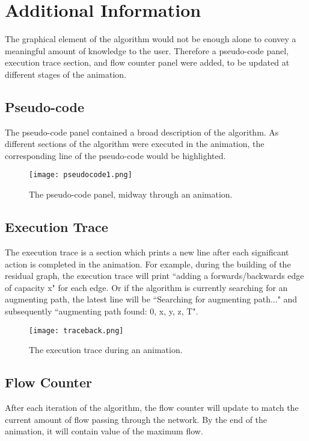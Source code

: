 \documentclass{l4proj}
\begin{document}
\section{Additional Information}
The graphical element of the algorithm would not be enough alone to convey a meaningful amount of knowledge to the user. Therefore a pseudo-code panel, execution trace section, and flow counter panel were added, to be updated at different stages of the animation.
\subsection{Pseudo-code}
The pseudo-code panel contained a broad description of the algorithm. As different sections of the algorithm were executed in the animation, the corresponding line of the pseudo-code would be highlighted.

\begin{figure}[h]
    \centering
    \texttt{[image: pseudocode1.png]}
    \caption{The pseudo-code panel, midway through an animation.}
    \label{fig:my_label}
\end{figure}

\subsection{Execution Trace}
The execution trace is a section which prints a new line after each significant action is completed in the animation. For example, during the building of the residual graph, the execution trace will print ``adding a forwards/backwards edge of capacity x" for each edge. Or if the algorithm is currently searching for an augmenting path, the latest line will be ``Searching for augmenting path..." and subsequently ``augmenting path found: 0, x, y, z, T".

\begin{figure}[h]
    \centering
    \texttt{[image: traceback.png]}
    \caption{The execution trace during an animation.}
    \label{fig:my_label}
\end{figure}

\subsection{Flow Counter}
After each iteration of the algorithm, the flow counter will update to match the current amount of flow passing through the network. By the end of the animation, it will contain value of the maximum flow.
\end{document}
